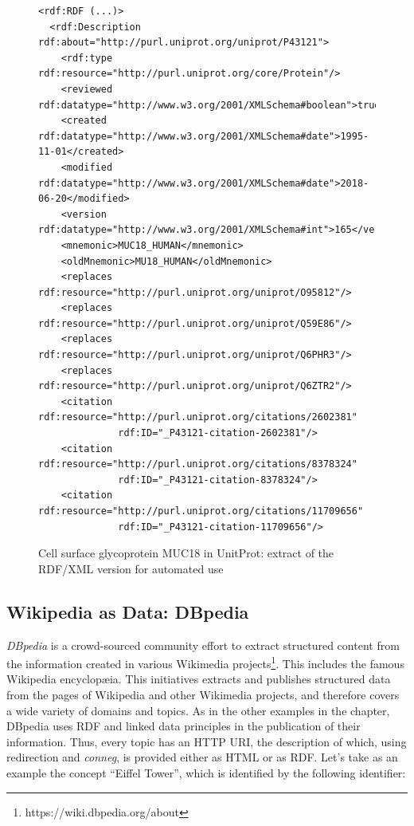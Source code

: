 \begin{figure}
\begin{lstlisting}
<rdf:RDF (...)>
  <rdf:Description rdf:about="http://purl.uniprot.org/uniprot/P43121">
    <rdf:type rdf:resource="http://purl.uniprot.org/core/Protein"/>
    <reviewed rdf:datatype="http://www.w3.org/2001/XMLSchema#boolean">true</reviewed>
    <created rdf:datatype="http://www.w3.org/2001/XMLSchema#date">1995-11-01</created>
    <modified rdf:datatype="http://www.w3.org/2001/XMLSchema#date">2018-06-20</modified>
    <version rdf:datatype="http://www.w3.org/2001/XMLSchema#int">165</version>
    <mnemonic>MUC18_HUMAN</mnemonic>
    <oldMnemonic>MU18_HUMAN</oldMnemonic>
    <replaces rdf:resource="http://purl.uniprot.org/uniprot/O95812"/>
    <replaces rdf:resource="http://purl.uniprot.org/uniprot/Q59E86"/>
    <replaces rdf:resource="http://purl.uniprot.org/uniprot/Q6PHR3"/>
    <replaces rdf:resource="http://purl.uniprot.org/uniprot/Q6ZTR2"/>
    <citation rdf:resource="http://purl.uniprot.org/citations/2602381" 
              rdf:ID="_P43121-citation-2602381"/>
    <citation rdf:resource="http://purl.uniprot.org/citations/8378324" 
              rdf:ID="_P43121-citation-8378324"/>
    <citation rdf:resource="http://purl.uniprot.org/citations/11709656" 
              rdf:ID="_P43121-citation-11709656"/>
\end{lstlisting}
    \caption{Cell surface glycoprotein MUC18 in UnitProt: extract of the
RDF/XML version for automated use}
    \label{fig:ch5.6}
\end{figure}

\subsection{Wikipedia as Data: DBpedia}
\label{dbpedia}

\emph{DBpedia} is a crowd-sourced community effort to extract structured
content from the information created in various Wikimedia projects\footnote{https://wiki.dbpedia.org/about}. 
This includes the famous Wikipedia encyclop{\ae}ia.  This initiatives extracts
and publishes structured data from the pages of Wikipedia
and other Wikimedia projects, and therefore covers a wide variety of
domains and topics. As in the other examples in the chapter, DBpedia uses RDF and linked data 
principles in the publication of their information. 
Thus, every topic has an HTTP URI, the description of which, using redirection and \emph{conneg},  
is provided  either as
HTML or as 
RDF. Let's take as an example the concept ``Eiffel Tower'', which is identified by the
following identifier:

